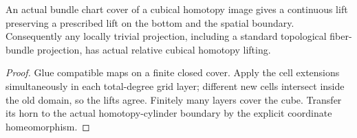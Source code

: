 \begin{proposition}
  \label{prop:actual-bundle-cubical-lifting}
  \leanok
  An actual bundle chart cover of a cubical homotopy image gives a continuous lift preserving a prescribed lift on the bottom and the spatial boundary. Consequently any locally trivial projection, including a standard topological fiber-bundle projection, has actual relative cubical homotopy lifting.
\end{proposition}
\begin{proof}
  Glue compatible maps on a finite closed cover. Apply the cell extensions simultaneously in each total-degree grid layer; different new cells intersect inside the old domain, so the lifts agree. Finitely many layers cover the cube. Transfer its horn to the actual homotopy-cylinder boundary by the explicit coordinate homeomorphism.
  \leanok
\end{proof}

